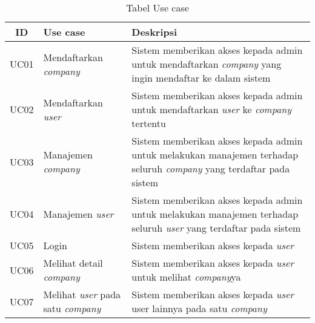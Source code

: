 \bgroup
\begin{table}[ht]
  \def\arraystretch{1.7}
  \caption{Tabel Use case}
  \label{tab:penjelasan-usecase-diagram}
  \centering
  \begin{tabular}{|c|p{4cm}|p{7.5cm}|}
    \hline
    ID   & Use case                                              & Deskripsi                                                                                                                                  \\
    \hline
    UC01 & Mendaftarkan \textit{company}                         & Sistem memberikan akses kepada admin untuk mendaftarkan \textit{company} yang ingin mendaftar ke dalam sistem                              \\
    \hline
    UC02 & Mendaftarkan \textit{user}                            & Sistem memberikan akses kepada admin untuk mendaftarkan \textit{user} ke \textit{company} tertentu                                         \\
    \hline
    UC03 & Manajemen \textit{company}                            & Sistem memberikan akses kepada admin untuk melakukan manajemen terhadap seluruh \textit{company} yang terdaftar pada sistem                \\
    \hline
    UC04 & Manajemen \textit{user}                               & Sistem memberikan akses kepada admin untuk melakukan manajemen terhadap seluruh \textit{user} yang terdaftar pada sistem                   \\
    \hline
    UC05 & Login                                                 & Sistem memberikan akses kepada \textit{user}                                                                                               \\
    \hline
    UC06 & Melihat detail \textit{company}                       & Sistem memberikan akses kepada \textit{user} untuk melihat \textit{company}ya                                                              \\
    \hline
    UC07 & Melihat \textit{user} pada satu \textit{company}      & Sistem memberikan akses kepada \textit{user} user lainnya pada satu \textit{company}                                                       \\


\end{tabular}
\end{table}
